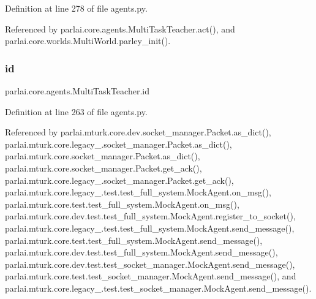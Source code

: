 Definition at line 278 of file agents.\+py.



Referenced by parlai.\+core.\+agents.\+Multi\+Task\+Teacher.\+act(), and parlai.\+core.\+worlds.\+Multi\+World.\+parley\+\_\+init().

\mbox{\label{classparlai_1_1core_1_1agents_1_1MultiTaskTeacher_a875d7474eb3fcb0ff1b302db284ebf7b}} 
\subsubsection{\texorpdfstring{id}{id}}
{\footnotesize\ttfamily parlai.\+core.\+agents.\+Multi\+Task\+Teacher.\+id}



Definition at line 263 of file agents.\+py.



Referenced by parlai.\+mturk.\+core.\+dev.\+socket\+\_\+manager.\+Packet.\+as\+\_\+dict(), parlai.\+mturk.\+core.\+legacy\+\_.\+socket\+\_\+manager.\+Packet.\+as\+\_\+dict(), parlai.\+mturk.\+core.\+socket\+\_\+manager.\+Packet.\+as\+\_\+dict(), parlai.\+mturk.\+core.\+socket\+\_\+manager.\+Packet.\+get\+\_\+ack(), parlai.\+mturk.\+core.\+legacy\+\_.\+socket\+\_\+manager.\+Packet.\+get\+\_\+ack(), parlai.\+mturk.\+core.\+legacy\+\_.\+test.\+test\+\_\+full\+\_\+system.\+Mock\+Agent.\+on\+\_\+msg(), parlai.\+mturk.\+core.\+test.\+test\+\_\+full\+\_\+system.\+Mock\+Agent.\+on\+\_\+msg(), parlai.\+mturk.\+core.\+dev.\+test.\+test\+\_\+full\+\_\+system.\+Mock\+Agent.\+register\+\_\+to\+\_\+socket(), parlai.\+mturk.\+core.\+legacy\+\_.\+test.\+test\+\_\+full\+\_\+system.\+Mock\+Agent.\+send\+\_\+message(), parlai.\+mturk.\+core.\+test.\+test\+\_\+full\+\_\+system.\+Mock\+Agent.\+send\+\_\+message(), parlai.\+mturk.\+core.\+dev.\+test.\+test\+\_\+full\+\_\+system.\+Mock\+Agent.\+send\+\_\+message(), parlai.\+mturk.\+core.\+dev.\+test.\+test\+\_\+socket\+\_\+manager.\+Mock\+Agent.\+send\+\_\+message(), parlai.\+mturk.\+core.\+test.\+test\+\_\+socket\+\_\+manager.\+Mock\+Agent.\+send\+\_\+message(), and parlai.\+mturk.\+core.\+legacy\+\_.\+test.\+test\+\_\+socket\+\_\+manager.\+Mock\+Agent.\+send\+\_\+message().

